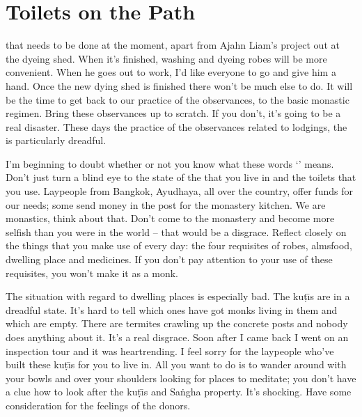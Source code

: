 \vspace*{\baselineskip}

\section{Toilets on the Path}

 that needs to be done at the moment, apart from Ajahn Liam's project out at the dyeing shed. When it's finished, washing and dyeing robes will be more convenient. When he goes out to work, I'd like everyone to go and give him a hand. Once the new dying shed is finished there won't be much else to do. It will be the time to get back to our practice of the observances, to the basic monastic regimen. Bring these observances up to scratch. If you don't, it's going to be a real disaster. These days the practice of the observances related to lodgings, the  is particularly dreadful.

I'm beginning to doubt whether or not you know what these words `' means. Don't just turn a blind eye to the state of the  that you live in and the toilets that you use. Laypeople from Bangkok, Ayudhaya, all over the country, offer funds for our needs; some send money in the post for the monastery kitchen. We are monastics, think about that. Don't come to the monastery and become more selfish than you were in the world -- that would be a disgrace. Reflect closely on the things that you make use of every day: the four requisites of robes, almsfood, dwelling place and medicines. If you don't pay attention to your use of these requisites, you won't make it as a monk.

The situation with regard to dwelling places is especially bad. The ku\d{t}\={\i}s are in a dreadful state. It's hard to tell which ones have got monks living in them and which are empty. There are termites crawling up the concrete posts and nobody does anything about it. It's a real disgrace. Soon after I came back I went on an inspection tour and it was heartrending. I feel sorry for the laypeople who've built these ku\d{t}\={\i}s for you to live in. All you want to do is to wander around with your bowls and  over your shoulders looking for places to meditate; you don't have a clue how to look after the ku\d{t}\={\i}s and Sa\.ngha property. It's shocking. Have some consideration for the feelings of the donors.

